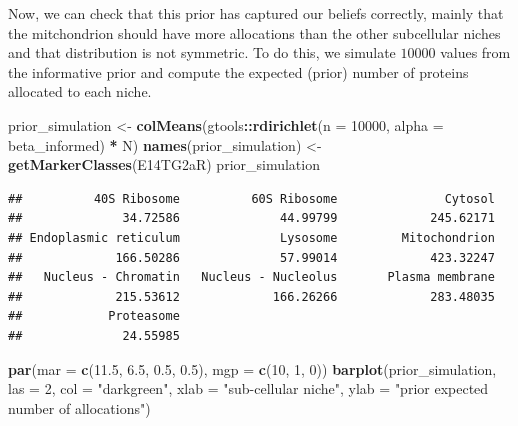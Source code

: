\documentclass[
]{article}
\newenvironment{Shaded}{\begin{snugshade}}{\end{snugshade}}
\newcommand{\DataTypeTok}[1]{\textcolor[rgb]{0.13,0.29,0.53}{#1}}
\newcommand{\DecValTok}[1]{\textcolor[rgb]{0.00,0.00,0.81}{#1}}
\newcommand{\FloatTok}[1]{\textcolor[rgb]{0.00,0.00,0.81}{#1}}
\newcommand{\KeywordTok}[1]{\textcolor[rgb]{0.13,0.29,0.53}{\textbf{#1}}}
\newcommand{\NormalTok}[1]{#1}
\newcommand{\OperatorTok}[1]{\textcolor[rgb]{0.81,0.36,0.00}{\textbf{#1}}}
\newcommand{\StringTok}[1]{\textcolor[rgb]{0.31,0.60,0.02}{#1}}
\begin{document}
Now, we can check that this prior has captured our beliefs correctly,
mainly that the mitchondrion should have more allocations than the other
subcellular niches and that distribution is not symmetric. To do this,
we simulate \(10000\) values from the informative prior and compute the
expected (prior) number of proteins allocated to each niche.

\begin{Shaded}
\begin{Highlighting}[]
\NormalTok{prior_simulation <-}\StringTok{ }\KeywordTok{colMeans}\NormalTok{(gtools}\OperatorTok{::}\KeywordTok{rdirichlet}\NormalTok{(}\DataTypeTok{n =} \DecValTok{10000}\NormalTok{, }\DataTypeTok{alpha =}\NormalTok{ beta_informed) }\OperatorTok{*}\StringTok{ }\NormalTok{N)}
\KeywordTok{names}\NormalTok{(prior_simulation) <-}\StringTok{ }\KeywordTok{getMarkerClasses}\NormalTok{(E14TG2aR)}
\NormalTok{prior_simulation}
\end{Highlighting}
\end{Shaded}

\begin{verbatim}
##          40S Ribosome          60S Ribosome               Cytosol 
##              34.72586              44.99799             245.62171 
## Endoplasmic reticulum              Lysosome         Mitochondrion 
##             166.50286              57.99014             423.32247 
##   Nucleus - Chromatin   Nucleus - Nucleolus       Plasma membrane 
##             215.53612             166.26266             283.48035 
##            Proteasome 
##              24.55985
\end{verbatim}

\begin{Shaded}
\begin{Highlighting}[]
\KeywordTok{par}\NormalTok{(}\DataTypeTok{mar =} \KeywordTok{c}\NormalTok{(}\FloatTok{11.5}\NormalTok{, }\FloatTok{6.5}\NormalTok{, }\FloatTok{0.5}\NormalTok{, }\FloatTok{0.5}\NormalTok{), }\DataTypeTok{mgp =} \KeywordTok{c}\NormalTok{(}\DecValTok{10}\NormalTok{, }\DecValTok{1}\NormalTok{, }\DecValTok{0}\NormalTok{))}
\KeywordTok{barplot}\NormalTok{(prior_simulation, }\DataTypeTok{las =} \DecValTok{2}\NormalTok{, }\DataTypeTok{col =} \StringTok{"darkgreen"}\NormalTok{, }\DataTypeTok{xlab =} \StringTok{"sub-cellular niche"}\NormalTok{, }\DataTypeTok{ylab =} \StringTok{"prior expected number of allocations"}\NormalTok{)}
\end{Highlighting}
\end{Shaded}
\end{document}
